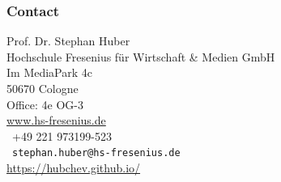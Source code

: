 \subsubsection*{Contact}
Prof. Dr. Stephan Huber\\
Hochschule Fresenius für Wirtschaft \& Medien GmbH\\
Im MediaPark 4c\\
50670 Cologne\\[1em]
Office: 4e OG-3 \\
\url{www.hs-fresenius.de}\\[1em]
 \faPhoneSquare~+49 221 973199-523 \\
{\faEnvelope~\small\texttt{stephan.huber@hs-fresenius.de}}\\
\websmall \url{https://hubchev.github.io/}\\
	